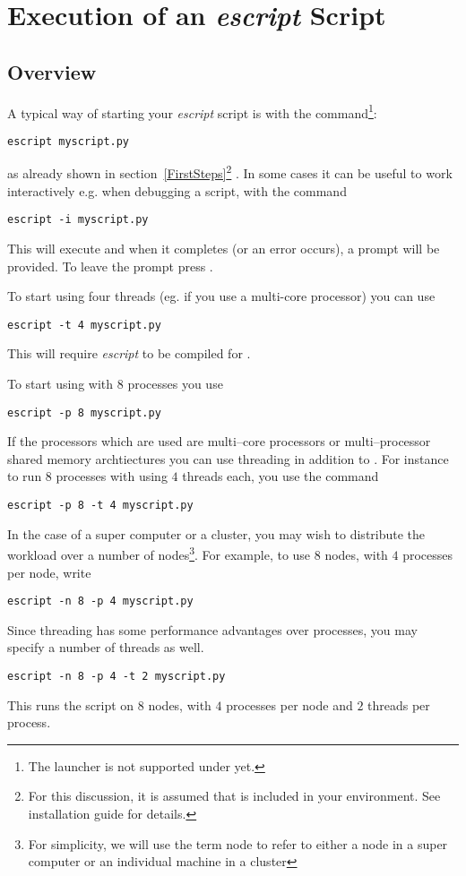 \chapter{Execution of an {\it escript} Script}
\label{EXECUTION}

\section{Overview}
A typical way of starting your {\it escript} script  is with the  command\footnote{The  launcher is not supported under \WINDOWS yet.}:
\begin{verbatim}
escript myscript.py
\end{verbatim}
as already shown in section~\ref{FirstSteps}\footnote{For this discussion, it is assumed that  is included in your  environment. See installation guide for details.}
. In some cases 
it can be useful to work interactively e.g. when debugging a script, with the command 
\begin{verbatim}
escript -i myscript.py
\end{verbatim}
This will execute  and when it completes (or an error occurs), a \PYTHON prompt will be provided.
To leave the prompt press .

To start 
 using four threads (eg. if you use a multi-core processor) you can use
\begin{verbatim}
escript -t 4 myscript.py
\end{verbatim}
This will require {\it escript} to be compiled for \OPENMP\cite{OPENMP}. 

To start  using \MPI\cite{MPI} with $8$ processes you use
\begin{verbatim}
escript -p 8 myscript.py
\end{verbatim}
If the processors which are used are multi--core processors or multi--processor shared memory archtiectures you can use threading in addition to \MPI. For instance to run $8$ \MPI processes with using $4$ threads each, you use the command
\begin{verbatim}
escript -p 8 -t 4 myscript.py
\end{verbatim}
In the case of a super computer or a cluster, you may wish to distribute the workload over a number of nodes\footnote{For simplicity, we will use the term node to refer to either a node in a super computer or an individual machine in a cluster}.
For example, to use $8$ nodes, with $4$ \MPI processes per node, write
\begin{verbatim}
escript -n 8 -p 4 myscript.py
\end{verbatim}
Since threading has some performance advantages over processes, you may specify a number of threads as well.
\begin{verbatim}
escript -n 8 -p 4 -t 2 myscript.py
\end{verbatim}
This runs the script on $8$ nodes, with $4$ processes per node and $2$ threads per process.

